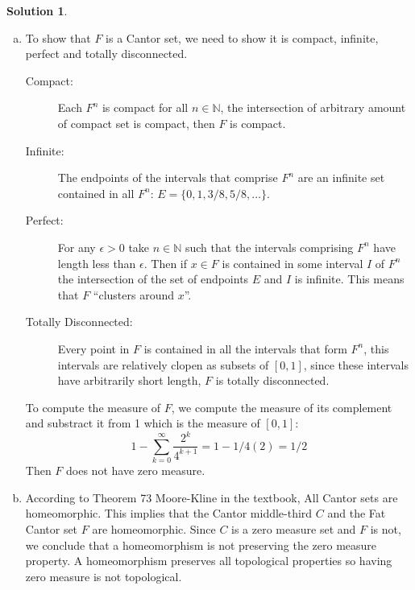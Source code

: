 \documentclass{article}
\theoremstyle{definition}
\newtheorem*{soln}{Solution}
\theoremstyle{theorem}
\newcommand{\N}{\mathbb{N}}
\begin{document}
            \begin{soln}
    \begin{enumerate}[(a)]
        \item            To show that $F$ is a Cantor set, we need to show it is compact, infinite, perfect and totally disconnected.
                \begin{description}
                    \item[Compact:] Each $F^n$ is compact for all $n\in \N$, the intersection of arbitrary amount of compact set is compact, then $F$ is compact.
                    \item[Infinite:] The endpoints of the intervals that comprise $F^n$ are an infinite set contained in all $F^n$: $E = \{ 0, 1, 3/8, 5/8,\ldots \}$.
                    \item[Perfect:] For any $\epsilon>0$ take $n\in \N$ such that the intervals comprising $F^n$ have length less than $\epsilon$. Then if $x\in F$ is contained in some interval $I$ of $F^n$ the intersection of the set of endpoints $E$ and $I$ is infinite. This means that $F$ ``clusters around $x$''.

                    \item[Totally Disconnected:] Every point in $F$ is contained in all the intervals that form $F^n$, this intervals are relatively clopen as subsets of $[0,1]$, since these intervals have arbitrarily short length, $F$ is totally disconnected.
                \end{description}

                To compute the measure of $F$, we compute the measure of its complement and substract it from 1 which is the measure of $[0,1]$:
                $$1 - \sum_{k=0 }^\infty \frac{2^k}{4^{k+1 }} = 1-1/4(2) = 1/2$$
                Then $F$ does not have zero measure.

            \item According to Theorem 73 Moore-Kline in the textbook, All Cantor sets are homeomorphic. This implies that the Cantor middle-third $C$   and the Fat Cantor set $F$ are homeomorphic. Since $C$ is a zero measure set and $F$ is not, we conclude that a homeomorphism is not preserving the zero measure property. A homeomorphism preserves all topological properties so having zero measure is not topological.
    \end{enumerate}
            \end{soln}
\vspace{1in}
\end{document}
